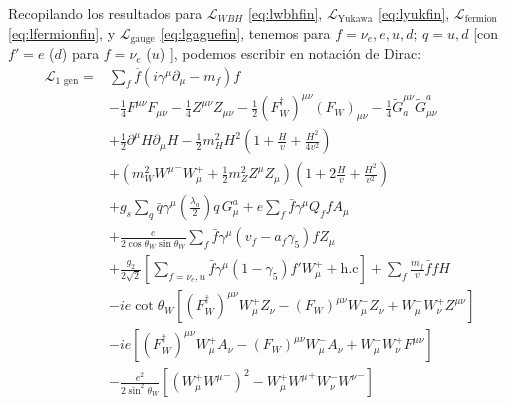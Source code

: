 \begin{frame}
Recopilando los resultados para $\mathcal{L}_{WBH}$ \eqref{eq:lwbhfin}, $\mathcal{L}_{\text{Yukawa}}$ \eqref{eq:lyukfin}, $\mathcal{L}_{\text{fermion}}$ \eqref{eq:lfermionfin}, y $\mathcal{L}_{\text{gauge}}$ \eqref{eq:lgaguefin}, tenemos  para $f=\nu_e,e,u,d$; $q=u,d$ [con $f'=e$ ($d$) para $f=\nu_e$ ($u$) ], podemos escribir en notación de Dirac:
\begin{align*}
  \mathcal{L}_{\text{1 gen}}=&\sum_f \overline{f}\left(i\gamma^\mu\partial_\mu-m_f\right)f\nonumber\\
&-\tfrac{1}{4}F^{\mu\nu} F_{\mu\nu}-\tfrac{1}{4}Z^{\mu\nu} Z_{\mu\nu}-\tfrac{1}{2}(F_W^\dagger)^{\mu\nu} (F_W)_{\mu\nu}
- \tfrac{1}{4}\widetilde{G}^{\mu\nu}_a \widetilde{G}_{\mu\nu}^a\nonumber\\
&+\tfrac{1}{2}\partial^\mu H\partial_\mu H
-\frac{1}{2}m_H^2H^2\left(1+\frac{H}{v}+\frac{H^2}{4v^2}\right)\nonumber\\
&+\left(m_W^2{W^\mu}^-W_\mu^++\frac{1}{2}m_Z^2Z^\mu Z_\mu\right)\left(1+2\frac{H}{v}+\frac{H^2}{v^2}\right)\nonumber\\
&+g_s\sum_q\bar{q}\gamma^\mu\left(\frac{\lambda_a}{2}\right)q\,G_\mu^a+e\sum_f \bar{f}\gamma^\mu Q_f f A_\mu\nonumber\\
&+\frac{e}{2\cos\theta_W\sin\theta_W}\sum_{f}\bar{f}\gamma^\mu(v_f-a_f\gamma_5)f Z_\mu\nonumber\\
&+\frac{g_2}{2\sqrt{2}}\left[\sum_{f=\nu_e,u}\bar{f}\gamma^\mu(1-\gamma_5)f' W_\mu^++\text{h.c}\right]
+\sum_f \frac{m_f}{v} \bar{f}f H\nonumber\\
&-ie\cot\theta_W\left[(F_W^\dagger)^{\mu\nu}W_\mu^+ Z_\nu-(F_W)^{\mu\nu}W_\mu^- Z_\nu+W_\mu^-W_\nu^+Z^{\mu\nu}\right]\nonumber\\
&-ie\left[(F_W^\dagger)^{\mu\nu}W_\mu^+ A_\nu-(F_W)^{\mu\nu}W_\mu^- A_\nu+W_\mu^-W_\nu^+F^{\mu\nu}\right]\nonumber\\
&-\frac{e^2}{2\sin^2\theta_W}\left[\left(W_\mu^+{W^\mu}^-\right)^2-W_\mu^+{W^\mu}^+W_\nu^-{W^\nu}^-\right]\nonumber\\

\end{align*}
\end{frame}
